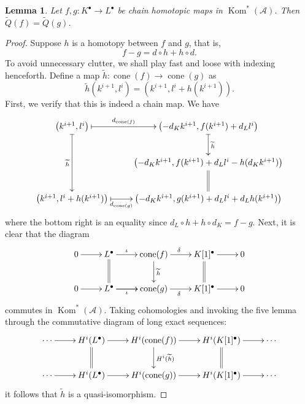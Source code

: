 \documentclass[11pt]{article}
\theoremstyle{thmstyle}
\newtheorem{lemma}[theorem]{Lemma}
\theoremstyle{defstyle}
\newcommand{\scrA}{\mathscr{A}}
\newcommand{\wt}[1]{\widetilde{#1}}
\newcommand{\Kom}{\operatorname{Kom}}
\newcommand{\cone}{\operatorname{cone}}
\begin{document}
\begin{lemma}
	Let $f,g\colon K^\bullet\to L^\bullet$ be chain homotopic maps in $\Kom^\ast(\scrA)$. Then $\wt Q(f) = \wt Q(g)$.
\end{lemma}
\begin{proof}
	Suppose $h$ is a homotopy between $f$ and $g$, that is, 
	\begin{equation*}
		f - g = d\circ h + h\circ d.
	\end{equation*}
	To avoid unnecessary clutter, we shall play fast and loose with indexing henceforth. Define a map $\wt h\colon\cone(f)\to\cone(g)$ as 
	\begin{equation*}
		\wt h\left(k^{i + 1}, l^i\right) = \left(k^{i + 1}, l^i + h(k^{i + 1})\right).
	\end{equation*}
	First, we verify that this is indeed a chain map. We have 
	\begin{equation*}
		\xymatrix {
			\left(k^{i + 1}, l^i\right)\ar@{|->}[r]^-{d_{\cone(f)}}\ar@{|->}[dd]_{\wt h} & \left(-d_K k^{i + 1}, f(k^{i + 1}) + d_L l^i\right)\ar@{|->}[d]^{\wt h}\\
			& \left(-d_K k^{i + 1}, f(k^{i + 1}) + d_L l^i - h(d_K k^{i + 1})\right)\ar@{=}[d]\\
			\left(k^{i + 1}, l^i + h(k^{i + 1})\right)\ar@{|->}[r]_-{d_{\cone(g)}} & \left(-d_K k^{i + 1}, g(k^{i + 1}) + d_Ll^i + d_L h(k^{i + 1})\right)
		}
	\end{equation*}
	where the bottom right is an equality since $d_L\circ h + h\circ d_K = f - g$. Next, it is clear that the diagram 
	\begin{equation*}
		\xymatrix {
			0\ar[r] & L^\bullet\ar[r]^-\iota\ar@{=}[d] & \cone(f)\ar[d]^{\wt h}\ar[r]^\delta & K[1]^\bullet\ar[r]\ar@{=}[d] & 0\\
			0\ar[r] & L^\bullet\ar[r]_-\iota\ar[r] & \cone(g)\ar[r]_\delta & K[1]^\bullet\ar[r] & 0
		}
	\end{equation*}
	commutes in $\Kom^\ast(\scrA)$. Taking cohomologies and invoking the five lemma through the commutative diagram of long exact sequences: 
	\begin{equation*}
		\xymatrix {
			\cdots\ar[r] & H^i(L^\bullet)\ar[r]\ar@{=}[d] & H^i(\cone(f))\ar[r]\ar[d]^{H^i(\wt h)} & H^i(K[1]^\bullet)\ar[r]\ar@{=}[d] & \cdots\\
			\cdots\ar[r] & H^i(L^\bullet)\ar[r] & H^i(\cone(g))\ar[r] & H^i(K[1]^\bullet)\ar[r] & \cdots
		}
	\end{equation*}
	it follows that $\wt h$ is a quasi-isomorphism.


\end{proof}
\end{document}
